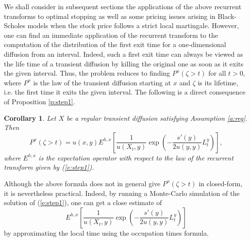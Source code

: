 \documentclass[11pt,reqno]{amsart}
\numberwithin{equation}{section}
\newtheorem{corollary}{Corollary}[section]
\begin{document}
We shall  consider in  subsequent sections the applications of the above recurrent transforms to optimal stopping as well as some pricing issues arising in Black-Scholes models when the stock  price follows a strict local martingale. However, one can find an immediate application of the recurrent transform to the computation of the distribution of the first exit time for a one-dimensional diffusion from an interval. Indeed,  such a first exit time can always be viewed as the life time of a transient diffusion by killing the original one as soon as it exits the given interval. Thus, the problem reduces to finding $P^x(\zeta>t)$ for all $t>0$, where $P^x$ is the law of the transient diffusion starting at $x$ and $\zeta$ is its lifetime, i.e. the first time it exits the given interval.  The following is a direct consequence of Proposition \ref{p:step1}.
\begin{corollary} \label{c:survfunction}  Let $X$ be a regular transient diffusion satisfying Assumption \ref{a:reg}.  Then
\[
P^x(\zeta>t)=  u(x,y)E^{h,x}\left[\frac{1}{u(X_t,y)}\exp\left(-\frac{s'(y)}{2u(y,y)}L^y_t\right)\right],
\]
where $E^{h,x}$ is the expectation operator with respect to the law of the recurrent transform given by (\ref{e:step1}). 
\end{corollary}
Although the above formula does not in general give $P^x(\zeta>t)$ in closed-form, it is nevertheless practical. Indeed, by running a Monte-Carlo simulation of the solution of (\ref{e:step1}), one can get a close estimate of
\[
E^{h,x}\left[\frac{1}{u(X_t,y)}\exp\left(-\frac{s'(y)}{2u(y,y)}L^y_t\right)\right]
\]
by approximating the local time using the occupation times formula. 
\end{document}
